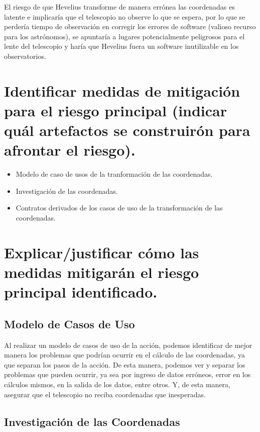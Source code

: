 \documentclass[letterpaper,spanish,10pt]{article}
\begin{document}
El riesgo de que Hevelius transforme de manera err\'onea las coordenadas es latente e implicar\'ia que el telescopio no observe
lo que se espera, por lo que se perder\'ia tiempo de observaci\'on en corregir los errores de software (valioso recurso para los
astr\'onomos), se apuntar\'ia a lugares potencialmente peligrosos para el lente del telescopio y har\'ia que Hevelius fuera un software
inutilizable en los observatorios.



\section{Identificar medidas de mitigaci\'on para el riesgo principal (indicar qu\'al artefactos se construir\'on para afrontar el riesgo).}

\begin{itemize}
	\item Modelo de caso de usos de la tranformaci\'on de las coordenadas.
	\item Investigaci\'on de las coordenadas.
	\item Contratos derivados de los casos de uso de la transformaci\'on de las coordenadas.
\end{itemize}


\section{Explicar/justificar c\'omo las medidas mitigar\'an el riesgo principal identificado.}

\subsection{Modelo de Casos de Uso}

Al realizar un modelo de casos de uso de la acci\'on, podemos identificar de mejor manera los problemas que podr\'ian ocurrir en el c\'alculo de las coordenadas, ya que separan los pasos de la acci\'on. De esta manera, podemos ver y separar los problemas que pueden ocurrir, ya sea por ingreso de datos err\'oneos, error en los c\'alculos mismos, en la salida de los datos, entre otros. Y, de esta manera, asegurar que el telescopio no reciba coordenadas que inesperadas.

\subsection{Investigaci\'on de las Coordenadas}
\end{document}

